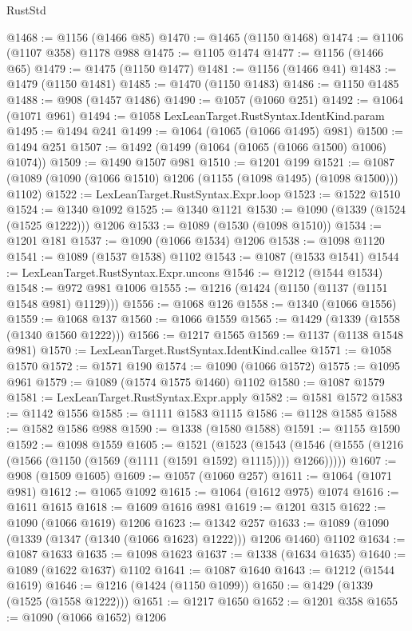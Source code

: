 \begin{lexlean}{RustStd}
\begin{coremodule}
{\begin{coremodule}
{{{{{{{{{{{{{{{{{{{{{{{{{{@1468 := @1156 (@1466 @85)
@1470 := @1465 (@1150 @1468)
@1474 := @1106 (@1107 @358) @1178 @988
@1475 := @1105 @1474
@1477 := @1156 (@1466 @65)
@1479 := @1475 (@1150 @1477)
@1481 := @1156 (@1466 @41)
@1483 := @1479 (@1150 @1481)
@1485 := @1470 (@1150 @1483)
@1486 := @1150 @1485
@1488 := @908 (@1457 @1486)
@1490 := @1057 (@1060 @251)
@1492 := @1064 (@1071 @961)
@1494 := @1058 LexLeanTarget.RustSyntax.IdentKind.param
@1495 := @1494 @241
@1499 := @1064 (@1065 (@1066 @1495) @981)
@1500 := @1494 @251
@1507 := @1492 (@1499 (@1064 (@1065 (@1066 @1500) @1006) @1074))
@1509 := @1490 @1507 @981
@1510 := @1201 @199
@1521 := @1087 (@1089 (@1090 (@1066 @1510) @1206 (@1155 (@1098 @1495) (@1098 @1500))) @1102)
@1522 := LexLeanTarget.RustSyntax.Expr.loop
@1523 := @1522 @1510
@1524 := @1340 @1092
@1525 := @1340 @1121
@1530 := @1090 (@1339 (@1524 (@1525 @1222))) @1206
@1533 := @1089 (@1530 (@1098 @1510))
@1534 := @1201 @181
@1537 := @1090 (@1066 @1534) @1206
@1538 := @1098 @1120
@1541 := @1089 (@1537 @1538) @1102
@1543 := @1087 (@1533 @1541)
@1544 := LexLeanTarget.RustSyntax.Expr.uncons
@1546 := @1212 (@1544 @1534)
@1548 := @972 @981 @1006
@1555 := @1216 (@1424 (@1150 (@1137 (@1151 @1548 @981) @1129)))
@1556 := @1068 @126
@1558 := @1340 (@1066 @1556)
@1559 := @1068 @137
@1560 := @1066 @1559
@1565 := @1429 (@1339 (@1558 (@1340 @1560 @1222)))
@1566 := @1217 @1565
@1569 := @1137 (@1138 @1548 @981)
@1570 := LexLeanTarget.RustSyntax.IdentKind.callee
@1571 := @1058 @1570
@1572 := @1571 @190
@1574 := @1090 (@1066 @1572)
@1575 := @1095 @961
@1579 := @1089 (@1574 @1575 @1460) @1102
@1580 := @1087 @1579
@1581 := LexLeanTarget.RustSyntax.Expr.apply
@1582 := @1581 @1572
@1583 := @1142 @1556
@1585 := @1111 @1583 @1115
@1586 := @1128 @1585
@1588 := @1582 @1586 @988
@1590 := @1338 (@1580 @1588)
@1591 := @1155 @1590
@1592 := @1098 @1559
@1605 := @1521
    (@1523
      (@1543 (@1546 (@1555 (@1216 (@1566 (@1150 (@1569 (@1111 (@1591 @1592) @1115)))) @1266)))))
@1607 := @908 (@1509 @1605)
@1609 := @1057 (@1060 @257)
@1611 := @1064 (@1071 @981)
@1612 := @1065 @1092
@1615 := @1064 (@1612 @975) @1074
@1616 := @1611 @1615
@1618 := @1609 @1616 @981
@1619 := @1201 @315
@1622 := @1090 (@1066 @1619) @1206
@1623 := @1342 @257
@1633 := @1089 (@1090 (@1339 (@1347 (@1340 (@1066 @1623) @1222))) @1206 @1460) @1102
@1634 := @1087 @1633
@1635 := @1098 @1623
@1637 := @1338 (@1634 @1635)
@1640 := @1089 (@1622 @1637) @1102
@1641 := @1087 @1640
@1643 := @1212 (@1544 @1619)
@1646 := @1216 (@1424 (@1150 @1099))
@1650 := @1429 (@1339 (@1525 (@1558 @1222)))
@1651 := @1217 @1650
@1652 := @1201 @358
@1655 := @1090 (@1066 @1652) @1206
}}}}}}}}}}}}}}}}}}}}}}}}}}
\end{coremodule}}
\end{coremodule}
\end{lexlean}

